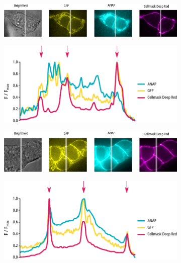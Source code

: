 \begin{figure}[hbtp]
	\centering
	\begin{subfigure}[t]{0.55\textwidth}
		\caption{}\label{ch3fig:wt_confocal}
		\centering
		\includegraphics[width=\textwidth]{wt_confocal.pdf}
	\end{subfigure}
	\hfill
	\begin{subfigure}[t]{0.35\textwidth}
		\caption{}\label{ch3fig:wt_confocal_profiles}
		\centering
		\includegraphics[width=\textwidth]{wt_confocal_profiles.pdf}
	\end{subfigure}
	\vfill
	\begin{subfigure}[t]{0.55\textwidth}
		\caption{}\label{ch3fig:w311_confocal}
		\centering
		\includegraphics[width=\textwidth]{w311_confocal.pdf}
	\end{subfigure}
	\hfill
	\begin{subfigure}[t]{0.35\textwidth}
		\caption{}\label{ch3fig:w311_confocal_profiles}
		\centering
		\includegraphics[width=\textwidth]{w311_confocal_profiles.pdf}

\end{subfigure}
\end{figure}
